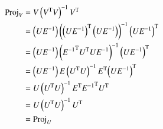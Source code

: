 \documentclass{article}      %
\newcommand{\transpose}[1]{{{#1}^{\text{T}}}}
\begin{document}
\begin{align*}
\Proj_V 
&= V \left(\transpose{V} V\right)^{-1} \transpose{V} \\
&= \left(U E^{-1}\right) \left(\transpose{\left(U E^{-1}\right)} \left(U E^{-1}\right)\right)^{-1} \transpose{\left(U E^{-1}\right)} \\
&= \left(U E^{-1}\right) \left( \transpose{E^{-1}} \transpose{U} U E^{-1}\right)^{-1} \transpose{\left(U E^{-1}\right)} \\
&= \left(U E^{-1}\right) E \left( \transpose{U}U\right)^{-1} \transpose{E} \transpose{\left(U E^{-1}\right)} \\
&= U \left( \transpose{U}U\right)^{-1} \transpose{E} \transpose{E^{-1}} \transpose{U} \\
&= U \left( \transpose{U}U\right)^{-1} \transpose{U} \\
&= \Proj_U
\end{align*}
\end{document}
